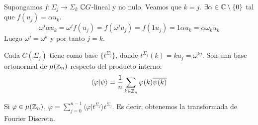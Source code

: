 Supongamos \(f:\Sigma_j\longrightarrow \Sigma_k\) \(\mathbb{C} G\)-lineal y no
nulo. Veamos que \(k=j\). \(\exists\alpha\in\mathbb{C}\setminus\{0\}\)
tal que \(f(u_j)=\alpha u_k\).
\[
  \omega^j \alpha u_k = \omega^j f(u_j)=f(\omega^j u_j)=f(1u_j)=1\alpha u_k
  =\alpha\omega_k u_k
\]
Luego \(\omega^j=\omega^k\) y por tanto \(j=k\).

Cada \(C(\Sigma_j)\) tiene como base \(\{t^{\Sigma_j}\}\), donde
\(t^{\Sigma_j}(k)=k u_j=\omega^{kj}\). Son una base ortonormal
de \(\mu(\mathbb{Z}_n)\) respecto del producto interno:
\[
  \langle\varphi|\psi\rangle=\frac{1}{n}\sum_{k\in\mathbb{Z}_n}\varphi(k)
  \overline{\psi(k)}
\]

Si \(\varphi\in\mu(\mathbb{Z}_n)\), \(\varphi=\sum_{j=0}^{n-1}\langle
\varphi|t^{\Sigma_j}\rangle t^{\Sigma_j}\). Es decir, obtenemos
la transformada de Fourier Discreta.





